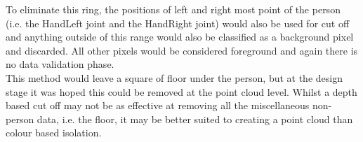 To eliminate this ring, the positions of left and right most point of the person (i.e. the HandLeft joint and the HandRight joint) would also be used for cut off and anything outside of this range would also be classified as a background pixel and discarded. All other pixels would be considered foreground and again there is no data validation phase.\\ 

This method would leave a square of floor under the person, but at the design stage it was hoped this could be removed at the point cloud level. Whilst a depth based cut off may not be as effective at removing all the miscellaneous non-person data, i.e. the floor, it may be better suited to creating a point cloud than colour based isolation.\\